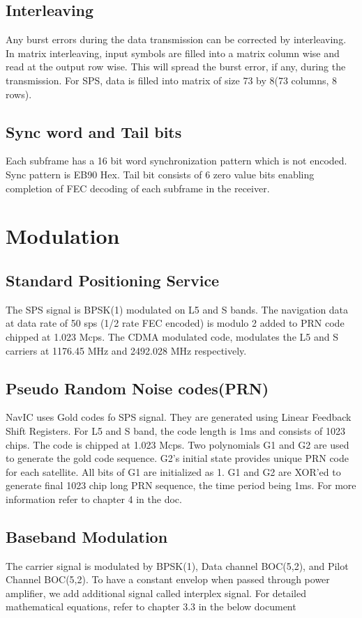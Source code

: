 \documentclass[11pt]{book}
\begin{document}
\subsection{Interleaving}
Any burst errors during the data transmission can be corrected by interleaving. In matrix interleaving, input symbols are filled into a matrix column wise and read at the output row wise. This will spread the burst error, if any, during the transmission. For SPS, data is filled into matrix of size 73 by 8(73 columns, 8 rows).
\subsection{Sync word and Tail bits}
Each subframe has a 16 bit word synchronization pattern which is not encoded. Sync pattern is EB90 Hex. Tail bit consists of 6 zero value bits enabling completion of FEC decoding of each subframe in the receiver.

\section{Modulation}
\subsection{Standard Positioning Service}
The SPS signal is BPSK(1) modulated on L5 and S bands. The navigation data at data rate of 50 sps (1/2 rate FEC encoded) is modulo 2 added to PRN code chipped at 1.023 Mcps. The CDMA modulated code, modulates the L5 and S carriers at 1176.45 MHz and 2492.028 MHz respectively.
\subsection{Pseudo Random Noise codes(PRN)}
NavIC uses Gold codes fo SPS signal. They are generated using Linear Feedback Shift Registers. For L5 and S band, the code length is 1ms and consists of 1023 chips. The code is chipped at 1.023 Mcps. Two polynomials G1 and G2 are used to generate the gold code sequence. G2's initial state provides unique PRN code for each satellite. All bits of G1 are initialized as 1. G1 and G2 are XOR'ed to generate final 1023 chip long PRN sequence, the time period being 1ms. For more information refer to chapter 4 in the doc.
\subsection{Baseband Modulation}
The carrier signal is modulated by BPSK(1), Data channel BOC(5,2), and Pilot Channel BOC(5,2). To have a constant envelop when passed through power amplifier, we add additional signal called interplex signal.
For detailed mathematical equations, refer to chapter 3.3 in the below document
%
\end{document}
